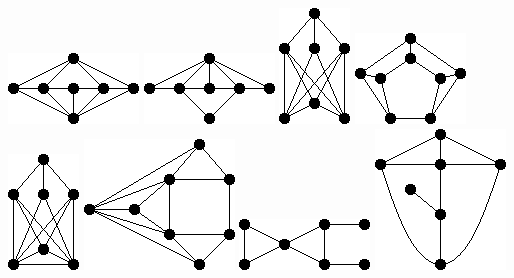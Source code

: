 \documentclass[11pt,paper=b5,footinclude,headinclude]{scrbook} %
\theoremstyle{remark}
\theoremstyle{definition} %
\theoremstyle{theorem} %
\begin{document}
\includegraphics[scale=0.5,frame]{smallGraphs/g_X106.png}     
\includegraphics[scale=0.5,frame]{smallGraphs/g_X107.png}     
\includegraphics[scale=0.5,frame]{smallGraphs/g_X11.png}     
\includegraphics[scale=0.5,frame]{smallGraphs/g_X111.png}     
\includegraphics[scale=0.5,frame]{smallGraphs/g_X12.png}     
\includegraphics[scale=0.5,frame]{smallGraphs/g_X120.png}     
\includegraphics[scale=0.5,frame]{smallGraphs/g_X127.png}     
\includegraphics[scale=0.5,frame]{smallGraphs/g_X13.png}     
\end{document}
